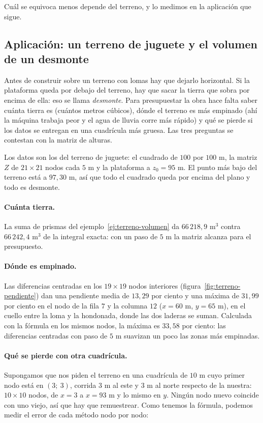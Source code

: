 Cuál se equivoca menos depende del terreno, y lo medimos en la aplicación que sigue.

\subsection{Aplicación: un terreno de juguete y el volumen de un desmonte}\label{sec:terreno-aplicacion}

Antes de construir sobre un terreno con lomas hay que dejarlo horizontal. Si la plataforma
queda por debajo del terreno, hay que sacar la tierra que sobra por encima de ella: eso se
llama \emph{desmonte}. Para presupuestar la obra hace falta saber cuánta tierra es (cuántos
metros cúbicos), dónde el terreno es más empinado (ahí la máquina trabaja peor y el agua de
lluvia corre más rápido) y qué se pierde si los datos se entregan en una cuadrícula más gruesa.
Las tres preguntas se contestan con la matriz de alturas.

Los datos son los del terreno de juguete: el cuadrado de \(100\) por \(100\) m, la matriz \(Z\) de
\(21\times21\) nodos cada \(5\) m y la plataforma a \(z_0=95\) m. El punto más bajo del terreno
está a \(97{,}30\) m, así que todo el cuadrado queda por encima del plano y todo es desmonte.

\paragraph{Cuánta tierra.} La suma de prismas del ejemplo~\ref{ej:terreno-volumen} da
\(66\,218{,}9\) m\(^3\) contra \(66\,242{,}4\) m\(^3\) de la integral exacta: con un paso de \(5\) m
la matriz alcanza para el presupuesto.

\paragraph{Dónde es empinado.} Las diferencias centradas en los \(19\times19\) nodos interiores
(figura~\ref{fig:terreno-pendiente}) dan una pendiente media de \(13{,}29\) por ciento y una máxima de
\(31{,}99\) por ciento en el nodo de la fila \(7\) y la columna \(12\) (\(x=60\) m, \(y=65\) m), en el
cuello entre la loma y la hondonada, donde las dos laderas se suman. Calculada con la fórmula
en los mismos nodos, la máxima es \(33{,}58\) por ciento: las diferencias centradas con paso de
\(5\) m suavizan un poco las zonas más empinadas.

\paragraph{Qué se pierde con otra cuadrícula.} Supongamos que nos piden el terreno en una
cuadrícula de \(10\) m cuyo primer nodo está en \((3;\ 3)\), corrida \(3\) m al este y \(3\) m al
norte respecto de la nuestra: \(10\times10\) nodos, de \(x=3\) a \(x=93\) m y lo mismo en \(y\).
Ningún nodo nuevo coincide con uno viejo, así que hay que remuestrear. Como tenemos la fórmula,
podemos medir el error de cada método nodo por nodo:

